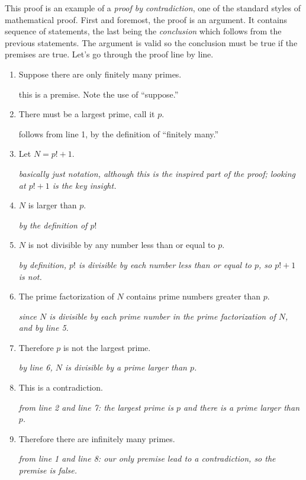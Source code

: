 \documentclass[10pt,]{book}
\theoremstyle{plain}
\theoremstyle{definition}
\theoremstyle{definition}
\theoremstyle{definition}
\numberwithin{equation}{chapter}
\begin{document}
This proof is an example of a \emph{proof by contradiction}, one of the standard styles of mathematical proof. First and foremost, the proof is an argument. It contains sequence of statements, the last being the \emph{conclusion} which follows from the previous statements. The argument is valid so the conclusion must be true if the premises are true. Let's go through the proof line by line.
%
\leavevmode%
\begin{enumerate}
\item\hypertarget{li-1082}{}
Suppose there are only finitely many primes.

 {this is a premise.  Note the use of ``suppose.''}
%
\item\hypertarget{li-1083}{}
There must be a largest prime, call it \(p\).

 {follows from line 1, by the definition of ``finitely many.''}
%
\item\hypertarget{li-1084}{}
Let \(N = p! + 1\).

  \emph{basically just notation, although this is the inspired part of the proof; looking at \(p! + 1\) is the key insight.}
%
\item\hypertarget{li-1085}{}\(N\) is larger than \(p\).

  \emph{by the definition of \(p!\)}%
\item\hypertarget{li-1086}{}\(N\) is not divisible by any number less than or equal to \(p\).

  \emph{by definition, \(p!\) is divisible by each number less than or equal to \(p\), so \(p! + 1\) is not.}%
\item\hypertarget{li-1087}{}
The prime factorization of \(N\) contains prime numbers greater than \(p\).

  \emph{since \(N\) is divisible by each prime number in the prime factorization of \(N\), and by line 5.}
%
\item\hypertarget{li-1088}{}
Therefore \(p\) is not the largest prime.

  \emph{by line 6, \(N\) is divisible by a prime larger than \(p\).}
%
\item\hypertarget{li-1089}{}
This is a contradiction.

  \emph{from line 2 and line 7: the largest prime is \(p\) and there is a prime larger than \(p\).}
%
\item\hypertarget{li-1090}{}
Therefore there are infinitely many primes.

  \emph{from line 1 and line 8: our only premise lead to a contradiction, so the premise is false.}
%
\end{enumerate}
\par
\end{document}
